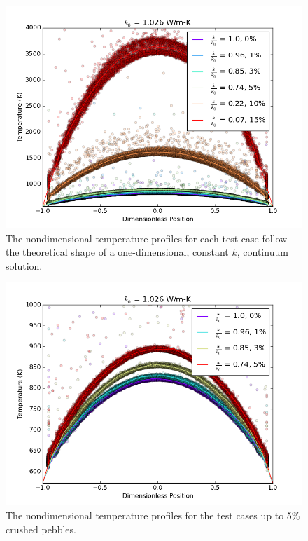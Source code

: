 \begin{figure}[htbp]
	\centering
	\includegraphics[width=\singleimagewidth]{chapters/figures/dem-evap-0-15-scatter-keff.png}
	\caption{The nondimensional temperature profiles for each test case follow the theoretical shape of a one-dimensional, constant $k$, continuum solution.}
\label{fig:temp-scatters}
\end{figure}

\begin{figure}[htbp]
	\centering
	\includegraphics[width=\singleimagewidth]{chapters/figures/dem-evap-0-5-scatter-keff.png}
	\caption{The nondimensional temperature profiles for the test cases up to 5\% crushed pebbles.}
\label{fig:temp-scatters-zoomed}
\end{figure}


